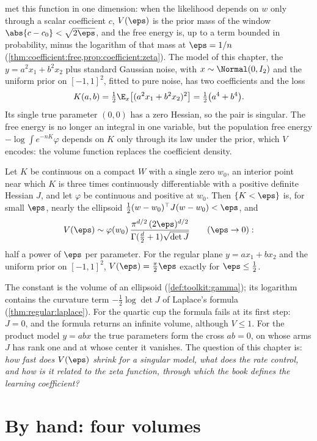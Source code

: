 \begin{refsection}
 met this function in one dimension: when the likelihood depends on $w$ only through a scalar coefficient $c$, $V(\eps)$ is the prior mass of the window $\abs{c-c_0}<\sqrt{2\eps}$, and the free energy is, up to a term bounded in probability, minus the logarithm of that mass at $\eps=1/n$ (\cref{thm:coefficient:free,prop:coefficient:zeta}). The model of this chapter, the  $y=a^2x_1+b^2x_2$ plus standard Gaussian noise, with $x\sim\Normal(0,I_2)$ and the uniform prior on $[-1,1]^2$, fitted to pure noise, has two coefficients and the loss
\[
K(a,b)=\tfrac12\E_x\bigl[(a^2x_1+b^2x_2)^2\bigr]=\tfrac12\bigl(a^4+b^4\bigr).
\]
Its single true parameter $(0,0)$ has a zero Hessian, so the pair is singular. The free energy is no longer an integral in one variable, but the population free energy $-\log\int e^{-nK}\varphi$ depends on $K$ only through its law under the prior, which $V$ encodes: the volume function replaces the coefficient density.

\begin{regularanswer}
Let $K$ be continuous on a compact $W$ with a single zero $w_0$, an interior point near which $K$ is three times continuously differentiable with a positive definite Hessian $J$, and let $\varphi$ be continuous and positive at $w_0$. Then $\{K<\eps\}$ is, for small $\eps$, nearly the ellipsoid $\tfrac12(w-w_0)^\top J(w-w_0)<\eps$, and
\[
V(\eps)\sim\varphi(w_0)\,\frac{\pi^{d/2}\,(2\eps)^{d/2}}{\Gamma(\frac d2+1)\sqrt{\det J}}\qquad(\eps\to0):
\]
half a power of $\eps$ per parameter. For the regular plane $y=ax_1+bx_2$ and the uniform prior on $[-1,1]^2$, $V(\eps)=\frac\pi2\eps$ exactly for $\eps\le\frac12$.
\end{regularanswer}

The constant is the volume of an ellipsoid (\cref{def:toolkit:gamma}); its logarithm contains the curvature term $-\frac12\log\det J$ of Laplace's formula (\cref{thm:regular:laplace}). For the quartic cup the formula fails at its first step: $J=0$, and the formula returns an infinite volume, although $V\le1$. For the product model $y=abx$ the true parameters form the cross $ab=0$, on whose arms $J$ has rank one and at whose center it vanishes. The question of this chapter is: \emph{how fast does $V(\eps)$ shrink for a singular model, what does the rate control, and how is it related to the zeta function, through which the book defines the learning coefficient?}

\section{By hand: four volumes}\label{sec:volume:byhand}


\end{refsection}
